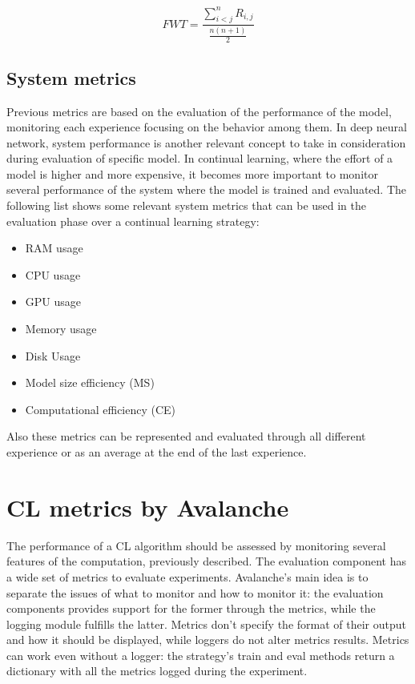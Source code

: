 \documentclass[english, LaM, oneside]{sapthesis}%
\begin{document}
\begin{equation}
                 FWT = \frac{\sum_{i < j}^{n}{R_{i,j}}}{\frac{n(n+1)}{2} } 
\end{equation}

\subsection{System metrics}
Previous metrics are based on the evaluation of the performance of the model, monitoring each experience focusing on the behavior among them.
In deep neural network, system performance is another relevant concept to take in consideration during evaluation of specific model. In continual learning, where the effort of a model is higher and more expensive, it becomes more important to monitor several performance of the system where the model is trained and evaluated. The following list shows some relevant system metrics that can be used in the evaluation phase over a continual learning strategy:
\begin{itemize}
    \item RAM usage
    \item CPU usage
    \item GPU usage
    \item Memory usage
    \item Disk Usage
    \item Model size efficiency (MS)
    \item Computational efficiency (CE)
 
\end{itemize}

Also these metrics can be represented and evaluated through all different experience or as an average at the end of the last experience.
\section{CL metrics by Avalanche}
The performance of a CL algorithm should be assessed by monitoring several features of the computation, previously described. The evaluation component has a wide set of metrics to evaluate experiments.
Avalanche’s main idea is to separate the issues of what to monitor and how to monitor it: the evaluation components provides support for the former through the metrics, while the logging module fulfills the latter. Metrics don't specify the format of their output and how it should be displayed, while loggers do not alter metrics results. Metrics can work even without a logger: the strategy’s train and eval methods return a dictionary with all the metrics logged during the experiment.
\end{document}
